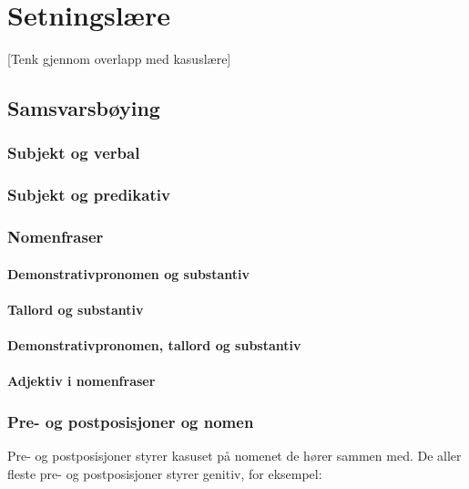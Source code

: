\chapter{Setningslære}

[Tenk gjennom overlapp med kasuslære]

\section{Samsvarsbøying}

\subsection{Subjekt og verbal}

\subsection{Subjekt og predikativ}

\subsection{Nomenfraser}

\subsubsection{Demonstrativpronomen og substantiv}

\subsubsection{Tallord og substantiv}

\subsubsection{Demonstrativpronomen, tallord og substantiv}

\subsubsection{Adjektiv i nomenfraser}

\subsection{Pre- og postposisjoner og nomen}

Pre- og postposisjoner styrer kasuset på nomenet de hører sammen med. De aller fleste pre- og postposisjoner styrer genitiv, for eksempel:

